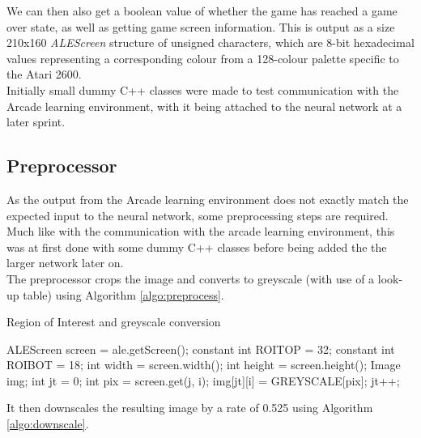 \documentclass[10pt]{article}
\begin{document}
		We can then also get a boolean value of whether the game has reached a game over state, as well as getting game screen information. This is output as a size 210x160 \textit{ALEScreen} structure of unsigned characters, which are 8-bit hexadecimal values representing a corresponding colour from a 128-colour palette specific to the Atari 2600.\\
		
		Initially small dummy C++ classes were made to test communication with the Arcade learning environment, with it being attached to the neural network at a later sprint.
	\medskip
	
	\subsection{Preprocessor}
	
	As the output from the Arcade learning environment does not exactly match the expected input to the neural network, some preprocessing steps are required. Much like with the communication with the arcade learning environment, this was at first done with some dummy C++ classes before being added the the larger network later on.\\
	
	The preprocessor crops the image and converts to greyscale (with use of a look-up table) using Algorithm \ref{algo:preprocess}.
	
		\begin{algorithm}[h]
			\caption{Region of Interest and greyscale conversion}
			\label{algo:preprocess}
			\begin{algorithmic}[1]
				\State ALEScreen screen = ale.getScreen();
				\State constant int ROI\textunderscore TOP = 32; constant int ROI\textunderscore BOT = 18;	
				\State int width = screen.width(); int height = screen.height();
				\State Image img;
				\State
				\State int jt = 0;
						\State int pix = screen.get(j, i);
						\State img[jt][i] = GREYSCALE[pix];		
					\EndFor
					\State jt++;
				\EndFor
			\end{algorithmic}
		\end{algorithm} 
	It then downscales the resulting image by a rate of 0.525 using Algorithm \ref{algo:downscale}.
		
\end{document}
